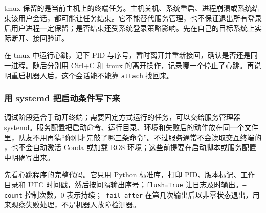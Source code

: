 \begin{note}
tmux 保留的是当前主机上的终端任务。主机关机、系统重启、进程崩溃或系统结束该用户会话，都可能让任务结束。它不能替代服务管理，也不保证退出所有登录后用户进程一定保留；是否结束还受系统登录策略影响。先在自己的目标系统上实际断开、接回验证。
\end{note}

\begin{exercise}\label{ex:deploy-tmux}
在 tmux 中运行心跳，记下 PID 与序号，暂时离开并重新接回，确认是否还是同一进程。随后分别用 Ctrl+C 和 tmux 的离开操作，记录哪一个停止了心跳。再说明重启机器人后，这个会话能不能靠 \texttt{attach} 找回来。
\end{exercise}

\subsubsection{用 systemd 把启动条件写下来}

调试阶段适合手动开终端；需要固定方式运行的任务，可以交给服务管理器 systemd。服务配置把启动命令、运行目录、环境和失败后的动作放在同一个文件里，队友不用再猜“你刚才先敲了哪三条命令”。不过服务通常不会读取交互终端的 ，也不会自动激活 Conda 或加载 ROS 环境；这些前提要在启动脚本或服务配置中明确写出来。

先看心跳程序的完整代码。它只用 Python 标准库，打印 PID、版本标记、工作目录和 UTC 时间戳，然后按间隔输出序号；\texttt{flush=True} 让日志及时输出。\texttt{--count} 控制次数，0 表示持续；\texttt{--fail-after} 在第几次输出后以非零状态退出，用来观察失败处理，不是机器人故障检测器。


